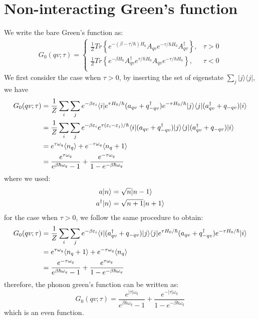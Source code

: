 \documentclass{article}
\begin{document}
\section{Non-interacting Green's function}
We write the bare Green's function as:
\begin{align}
    G_0(qv;\tau) = 
    \begin{cases}
        \frac{1}{Z} Tr\left\{ e^{-(\beta-\tau/\hbar)H_0} A_{qv} e^{-\tau/\hbar H_0} A_{qv}^{\dagger} \right\}, &\tau > 0 \\
        \frac{1}{Z} Tr\left\{ e^{-\beta H_0} A_{qv}^{\dagger} e^{\tau/\hbar H_0} A_{qv} e^{- \tau/\hbar H_0} \right\}, &\tau < 0 \\
    \end{cases}
\end{align}
We first consider the case when $\tau > 0$, by inserting the set of eigenstate $\sum_j |j\rangle \langle j | $, we have
\begin{align}
    G_0(qv;\tau) &= \frac{1}{Z} \sum_i \sum_j e^{-\beta \varepsilon_i} \langle i | e^{\tau H_0/\hbar} (a_{qv} + q_{-qv}^{\dagger}) e^{-\tau H_0/\hbar} | j \rangle 
                        \langle j | (a_{qv}^{\dagger} + q_{-qv}) | i \rangle  \notag \\
                &= \frac{1}{Z} \sum_i \sum_j e^{-\beta \varepsilon_i} e^{\tau(\varepsilon_i - \varepsilon_j)/\hbar} 
                \langle i | (a_{qv} + q_{-qv}^{\dagger}) | j \rangle \langle j | (a_{qv}^{\dagger} + q_{-qv}) | i \rangle  \notag \\
                &= e^{\tau \omega_q} \langle n_q \rangle + e^{- \tau \omega_q}  \langle n_q  + 1\rangle \notag \\
                &= \frac{e^{\tau \omega_q}}{e^{\beta \hbar \omega_q} - 1} + \frac{e^{-\tau \omega_q}}{1 - e^{-\beta \hbar \omega_q} }
\end{align}
where we used:
\begin{align}
    a | n \rangle &= \sqrt{n} | n-1 \rangle  \notag \\
    a^{\dagger} | n \rangle &= \sqrt{n+1} | n+1 \rangle \notag \\
\end{align}
for the case when $\tau > 0$, we follow the same procedure to obtain:
\begin{align}
    G_0(qv;\tau) &= \frac{1}{Z} \sum_i \sum_j e^{-\beta \varepsilon_i} \langle i | (a_{qv}^{\dagger} + q_{-qv}) | j \rangle
                        \langle j | e^{\tau H_0/\hbar} (a_{qv} + q_{-qv}^{\dagger}) e^{-\tau H_0/\hbar} | i \rangle  \notag \\
                &= e^{\tau \omega_q} \langle n_q + 1\rangle + e^{- \tau \omega_q} \langle n_q \rangle \notag \\
                &= \frac{e^{- \tau \omega_q}}{e^{\beta \hbar \omega_q} - 1} + \frac{e^{\tau \omega_q}}{1 - e^{-\beta \hbar \omega_q} }
\end{align}
therefore, the phonon green's function can be written as:
\begin{equation}
    G_0(qv;\tau) = \frac{e^{|\tau| \omega_q}}{e^{\beta \hbar \omega_q} - 1} + \frac{e^{-|\tau| \omega_q}}{1 - e^{-\beta \hbar \omega_q} }
\end{equation}
which is an even function.
\end{document}
